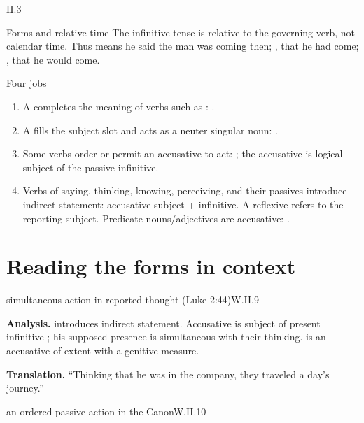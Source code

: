 \begin{courseunit}{II.3}
\begin{grammarbox}{Forms and relative time}
The infinitive tense is relative to the governing verb, not calendar time.  Thus
 means he said the man was coming then; , that
he had come; , that he would come.
\end{grammarbox}

\begin{grammarbox}{Four jobs}
\begin{enumerate}
  \item A  completes the meaning of verbs such
        as : .
  \item A  fills the subject slot and acts as a neuter
        singular noun: .
  \item Some verbs order or permit an accusative to act: ; the
        accusative is logical subject of the passive infinitive.
  \item Verbs of saying, thinking, knowing, perceiving, and their passives introduce indirect
        statement: accusative subject + infinitive.  A reflexive  refers to the
        reporting subject.  Predicate nouns/adjectives are accusative: .
\end{enumerate}
\end{grammarbox}

\section{Reading the forms in context}

\begin{workedexample}{simultaneous action in reported thought (Luke 2:44)}{W.II.9}

\textbf{Analysis.}   introduces indirect statement.  Accusative
 is subject of present infinitive ; his supposed presence is
simultaneous with their thinking.   is an accusative of extent with a
genitive measure.

\textbf{Translation.}  ``Thinking that he was in the company, they traveled a day's journey.''
\end{workedexample}

\begin{workedexample}{an ordered passive action in the Canon}{W.II.10}


\end{workedexample}
\end{courseunit}
